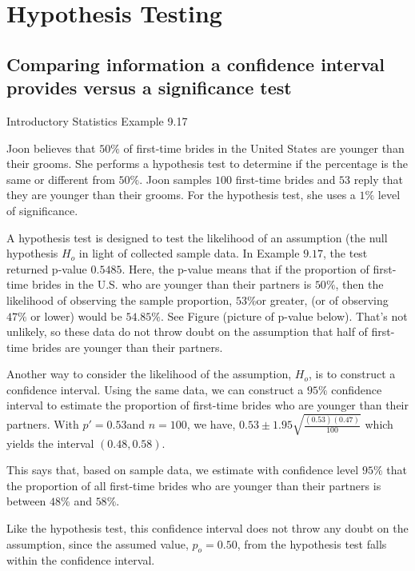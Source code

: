 \setcounter{chapter}{8}
\chapter{Hypothesis Testing}

\section{Comparing information a confidence interval provides versus a significance test}

Introductory Statistics Example 9.17

Joon believes that \(50\%\) of first-time brides in the United States are younger than their grooms. She performs a hypothesis test to determine if the percentage is the same or different from  \(50\%\). Joon samples  \(100\) first-time brides and  \(53\) reply that they are younger than their grooms. For the hypothesis test, she uses a  \(1\%\) level of significance.

A hypothesis test is designed to test the likelihood of an assumption (the null hypothesis \(H_{o}\) in light of collected sample data. In Example  \(9.17\), the test returned p-value  \(0.5485\). Here, the p-value means that if the proportion of first-time brides in the U.S. who are younger than their partners is  \(50\%\), then the likelihood of observing the sample proportion,  \(53\%\)or greater, (or of observing  \(47\%\) or lower) would be  \(54.85\%\). See Figure (picture of p-value below). That's not unlikely, so these data do not throw doubt on the assumption that half of first-time brides are younger than their partners.



Another way to consider the likelihood of the assumption, \(H_{o}\), is to construct a confidence interval. Using the same data, we can construct a  \(95\%\) confidence interval to estimate the proportion of first-time brides who are younger than their partners. With \(p'=0.53\)and  \(n=100\), we have, 
\(0.53 \pm 1.95 \sqrt{\frac{(0.53)(0.47)}{100}}\) which yields the interval \((0.48,0.58)\). 

This says that, based on sample data, we estimate with confidence level \(95\%\) that the proportion of all first-time brides who are younger than their partners is between  \(48\%\) and  \(58\%\). 

Like the hypothesis test, this confidence interval does not throw any doubt on the assumption, since the assumed value, \(p_{o}=0.50\), from the hypothesis test falls within the confidence interval. 

